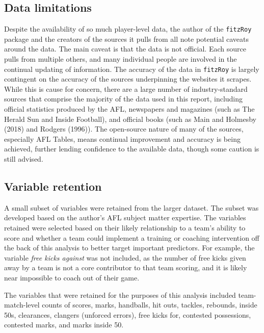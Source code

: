 \documentclass{article}
\begin{document}
\hypertarget{data-limitations}{%
\subsection{Data limitations}\label{data-limitations}}

Despite the availability of so much player-level data, the author of the \texttt{fitzRoy} package and the creators of the sources it pulls from all note potential caveats around the data. The main caveat is that the data is not official. Each source pulls from multiple others, and many individual people are involved in the continual updating of information. The accuracy of the data in \texttt{fitzRoy} is largely contingent on the accuracy of the sources underpinning the websites it scrapes. While this is cause for concern, there are a large number of industry-standard sources that comprise the majority of the data used in this report, including official statistics produced by the AFL, newspapers and magazines (such as The Herald Sun and Inside Football), and official books (such as Main and Holmesby (2018) and Rodgers (1996)). The open-source nature of many of the sources, especially AFL Tables, means continual improvement and accuracy is being achieved, further lending confidence to the available data, though some caution is still advised.

\hypertarget{variable-retention}{%
\subsection{Variable retention}\label{variable-retention}}

A small subset of variables were retained from the larger dataset. The subset was developed based on the author's AFL subject matter expertise. The variables retained were selected based on their likely relationship to a team's ability to score and whether a team could implement a training or coaching intervention off the back of this analysis to better target important predictors. For example, the variable \emph{free kicks against} was not included, as the number of free kicks given away by a team is not a core contributor to that team scoring, and it is likely near impossible to coach out of their game.

The variables that were retained for the purposes of this analysis included team-match-level counts of scores, marks, handballs, hit outs, tackles, rebounds, inside 50s, clearances, clangers (unforced errors), free kicks for, contested possessions, contested marks, and marks inside 50.
\end{document}
